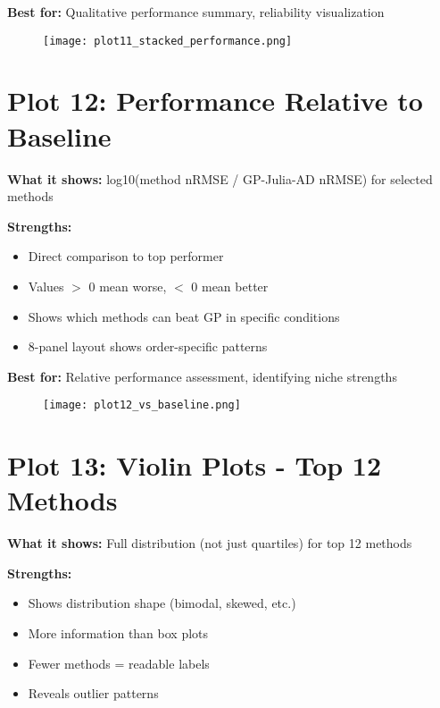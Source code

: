 \documentclass[11pt]{article}
\begin{document}
\textbf{Best for:} Qualitative performance summary, reliability visualization

\begin{figure}[h]
\centering
\texttt{[image: plot11\_stacked\_performance.png]}
\end{figure}

\clearpage


\section*{Plot 12: Performance Relative to Baseline}

\textbf{What it shows:} log10(method nRMSE / GP-Julia-AD nRMSE) for selected methods

\textbf{Strengths:}
\begin{itemize}
    \item Direct comparison to top performer
    \item Values $>$ 0 mean worse, $<$ 0 mean better
    \item Shows which methods can beat GP in specific conditions
    \item 8-panel layout shows order-specific patterns
\end{itemize}

\textbf{Best for:} Relative performance assessment, identifying niche strengths

\begin{figure}[h]
\centering
\texttt{[image: plot12\_vs\_baseline.png]}
\end{figure}

\clearpage


\section*{Plot 13: Violin Plots - Top 12 Methods}

\textbf{What it shows:} Full distribution (not just quartiles) for top 12 methods

\textbf{Strengths:}
\begin{itemize}
    \item Shows distribution shape (bimodal, skewed, etc.)
    \item More information than box plots
    \item Fewer methods = readable labels
    \item Reveals outlier patterns
\end{itemize}
\end{document}

